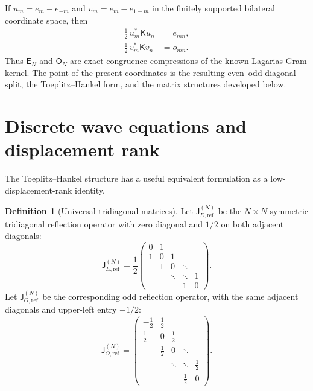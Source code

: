 \documentclass[preprint,12pt]{elsarticle}
\numberwithin{equation}{section}
\theoremstyle{plain}
\theoremstyle{definition}
\newtheorem{definition}[theorem]{Definition}
\theoremstyle{remark}
\newcommand{\E}{\mathsf E}
\newcommand{\Omat}{\mathsf O}
\newcommand{\Kmat}{\mathsf K}
\newcommand{\J}{\mathsf J}
\begin{document}
If $u_m=e_m-e_{-m}$ and $v_m=e_m-e_{1-m}$ in the finitely supported bilateral coordinate space, then
\begin{align}
\frac12\,u_m^*\Kmat u_n
&=e_{mn},
\label{eq:E_reflection_compression}\\
\frac12\,v_m^*\Kmat v_n
&=o_{mn}.
\label{eq:O_reflection_compression}
\end{align}
Thus $\E_N$ and $\Omat_N$ are exact congruence compressions of the known Lagarias Gram kernel. The point of the present coordinates is the resulting even--odd diagonal split, the Toeplitz--Hankel form, and the matrix structures developed below.

\section{Discrete wave equations and displacement rank}
\label{sec:displacement}

The Toeplitz--Hankel structure has a useful equivalent formulation as a low-displacement-rank identity.

\begin{definition}[Universal tridiagonal matrices]
\label{def:universal_tridiagonal}
Let $\J_{E,\mathrm{ref}}^{(N)}$ be the $N\times N$ symmetric tridiagonal reflection operator with zero diagonal and $1/2$ on both adjacent diagonals:
\begin{equation}
\J_{E,\mathrm{ref}}^{(N)}=
\frac12
\begin{pmatrix}
0&1&&&\\
1&0&1&&\\
&1&0&\ddots&\\
&&\ddots&\ddots&1\\
&&&1&0
\end{pmatrix}.
\label{eq:J_E_definition}
\end{equation}
Let $\J_{O,\mathrm{ref}}^{(N)}$ be the corresponding odd reflection operator, with the same adjacent diagonals and upper-left entry $-1/2$:
\begin{equation}
\J_{O,\mathrm{ref}}^{(N)}=
\begin{pmatrix}
-\tfrac12&\tfrac12&&&\\
\tfrac12&0&\tfrac12&&\\
&\tfrac12&0&\ddots&\\
&&\ddots&\ddots&\tfrac12\\
&&&\tfrac12&0
\end{pmatrix}.
\label{eq:J_O_definition}
\end{equation}
\end{definition}
\end{document}
